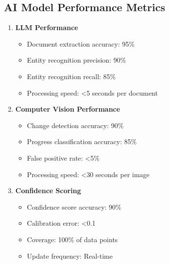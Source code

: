 \documentclass[business]{../templates/infraradar-main}
\begin{document}
\subsection{AI Model Performance Metrics}
\begin{enumerate}
    \item \textbf{LLM Performance}
    \begin{itemize}
        \item Document extraction accuracy: 95\%
        \item Entity recognition precision: 90\%
        \item Entity recognition recall: 85\%
        \item Processing speed: <5 seconds per document
    \end{itemize}
    
    \item \textbf{Computer Vision Performance}
    \begin{itemize}
        \item Change detection accuracy: 90\%
        \item Progress classification accuracy: 85\%
        \item False positive rate: <5\%
        \item Processing speed: <30 seconds per image
    \end{itemize}
    
    \item \textbf{Confidence Scoring}
    \begin{itemize}
        \item Confidence score accuracy: 90\%
        \item Calibration error: <0.1
        \item Coverage: 100\% of data points
        \item Update frequency: Real-time
    \end{itemize}
\end{enumerate}
\end{document}
